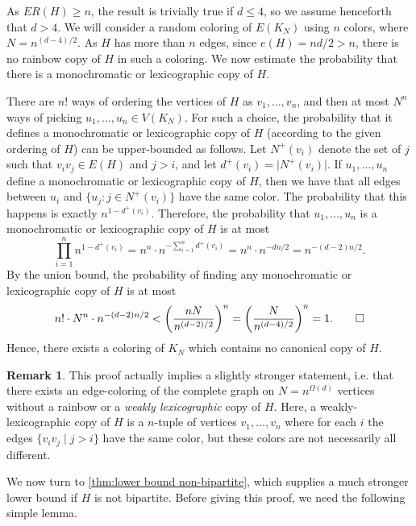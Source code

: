 \documentclass[a4paper,11pt]{article}
\makeatletter
\renewenvironment{proof}[1][\proofname] {\par\pushQED{\qed}\normalfont\topsep6\p@\@plus6\p@\relax\trivlist\item[\hskip\labelsep\bfseries#1\@addpunct{.}]\ignorespaces}{\popQED\endtrivlist\@endpefalse}
\theoremstyle{definition}
\newtheorem{remark}[theorem]{\bf Remark}
\newcommand{\ab}[1]{\lvert #1 \rvert}
\makeatother
\begin{document}
\begin{proof}[Proof of Theorem~\ref{thm:lower bound bipartite}.]
As $ER(H) \geq n$, the result is trivially true if $d \leq 4$, so we assume henceforth that $d > 4$. We will consider a random coloring of $E(K_N)$ using $n$ colors, where $N=n^{(d-4)/2}$. As $H$ has more than $n$ edges, since $e(H)=nd/2>n$, there is no rainbow copy of $H$ in such a coloring. We now estimate the probability that there is a monochromatic or lexicographic copy \nolinebreak of \nolinebreak $H$.

There are $n!$ ways of ordering the vertices of $H$ as $v_1,\dots,v_n$, and then at most $N^n$ ways of picking $u_1,\dots,u_n \in V(K_N)$. For such a choice, the probability that it defines a monochromatic or lexicographic copy of $H$ (according to the given ordering of $H$) can be upper-bounded as follows. Let $N^+(v_i)$ denote the set of $j$ such that $v_i v_j \in E(H)$ and $j>i$, and let $d^+(v_i)=\ab{N^+(v_i)}$. If $u_1,\dots,u_n$ define a monochromatic or lexicographic copy of $H$, then we have that all edges between $u_i$ and $\{u_j: j \in N^+(v_i)\}$ have the same color. The probability that this happens is exactly $n^{1-d^+(v_i)}$. Therefore, the probability that $u_1,\dots,u_n$ is a monochromatic or lexicographic copy of $H$ is at most
    \[
    \prod_{i=1}^n n^{1-d^+(v_i)} = n^n \cdot n^{-\sum_{i=1}^n d^+(v_i)} = n^n \cdot n^{-dn/2} = n^{-(d-2)n/2} .
    \]
    By the union bound, the probability of finding any monochromatic or lexicographic copy of $H$ is at most
    \[
        n! \cdot N^n \cdot n^{-(d-2)n/2} < \left( \frac{nN}{n^{(d-2)/2}}\right)^n = \left( \frac{N}{n^{(d-4)/2}}\right)^n =1.\qedhere
    \]
Hence, there exists a coloring of $K_N$ which contains no canonical copy of $H$. 
\end{proof}
\begin{remark}
This proof actually implies a slightly stronger statement, i.e. that there exists an edge-coloring of the complete graph on $N=n^{\Omega(d)}$ vertices without a rainbow or a \textit{weakly lexicographic} copy of $H$. Here, a weakly-lexicographic copy of $H$ is a $n$-tuple of vertices $v_1, \dots, v_n$ where for each $i$ the edges $\{v_iv_j\mid j>i\}$ have the same color, but these colors are not necessarily \nolinebreak all \nolinebreak different.
\end{remark}


We now turn to \cref{thm:lower bound non-bipartite}, which supplies a much stronger lower bound if $H$ is not bipartite. 
Before giving this proof, we need the following simple lemma.
\end{document}
